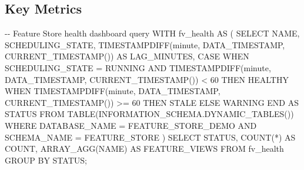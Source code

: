 \documentclass[
  letterpaper,
  DIV=11,
  numbers=noendperiod]{scrreprt}
\newenvironment{Shaded}{\begin{snugshade}}{\end{snugshade}}
\newcommand{\CommentTok}[1]{\textcolor[rgb]{0.37,0.37,0.37}{#1}}
\newcommand{\ControlFlowTok}[1]{\textcolor[rgb]{0.00,0.23,0.31}{#1}}
\newcommand{\DecValTok}[1]{\textcolor[rgb]{0.68,0.00,0.00}{#1}}
\newcommand{\FunctionTok}[1]{\textcolor[rgb]{0.28,0.35,0.67}{#1}}
\newcommand{\KeywordTok}[1]{\textcolor[rgb]{0.00,0.23,0.31}{#1}}
\newcommand{\NormalTok}[1]{\textcolor[rgb]{0.00,0.23,0.31}{#1}}
\newcommand{\OperatorTok}[1]{\textcolor[rgb]{0.37,0.37,0.37}{#1}}
\newcommand{\StringTok}[1]{\textcolor[rgb]{0.13,0.47,0.30}{#1}}
\begin{document}
\hypertarget{key-metrics}{%
\subsection{Key Metrics}\label{key-metrics}}

\begin{Shaded}
\begin{Highlighting}[]
\CommentTok{{-}{-} Feature Store health dashboard query}
\KeywordTok{WITH}\NormalTok{ fv\_health }\KeywordTok{AS}\NormalTok{ (}
    \KeywordTok{SELECT}
\NormalTok{        NAME,}
\NormalTok{        SCHEDULING\_STATE,}
\NormalTok{        TIMESTAMPDIFF(}\StringTok{\textquotesingle{}minute\textquotesingle{}}\NormalTok{, DATA\_TIMESTAMP, }\FunctionTok{CURRENT\_TIMESTAMP}\NormalTok{()) }\KeywordTok{AS}\NormalTok{ LAG\_MINUTES,}
        \ControlFlowTok{CASE}
            \ControlFlowTok{WHEN}\NormalTok{ SCHEDULING\_STATE }\OperatorTok{=} \StringTok{\textquotesingle{}RUNNING\textquotesingle{}}
                 \KeywordTok{AND}\NormalTok{ TIMESTAMPDIFF(}\StringTok{\textquotesingle{}minute\textquotesingle{}}\NormalTok{, DATA\_TIMESTAMP, }\FunctionTok{CURRENT\_TIMESTAMP}\NormalTok{()) }\OperatorTok{\textless{}} \DecValTok{60} \ControlFlowTok{THEN} \StringTok{\textquotesingle{}HEALTHY\textquotesingle{}}
            \ControlFlowTok{WHEN}\NormalTok{ TIMESTAMPDIFF(}\StringTok{\textquotesingle{}minute\textquotesingle{}}\NormalTok{, DATA\_TIMESTAMP, }\FunctionTok{CURRENT\_TIMESTAMP}\NormalTok{()) }\OperatorTok{\textgreater{}=} \DecValTok{60} \ControlFlowTok{THEN} \StringTok{\textquotesingle{}STALE\textquotesingle{}}
            \ControlFlowTok{ELSE} \StringTok{\textquotesingle{}WARNING\textquotesingle{}}
        \ControlFlowTok{END} \KeywordTok{AS}\NormalTok{ STATUS}
    \KeywordTok{FROM} \KeywordTok{TABLE}\NormalTok{(INFORMATION\_SCHEMA.DYNAMIC\_TABLES())}
    \KeywordTok{WHERE}\NormalTok{ DATABASE\_NAME }\OperatorTok{=} \StringTok{\textquotesingle{}FEATURE\_STORE\_DEMO\textquotesingle{}}
      \KeywordTok{AND}\NormalTok{ SCHEMA\_NAME }\OperatorTok{=} \StringTok{\textquotesingle{}FEATURE\_STORE\textquotesingle{}}
\NormalTok{)}
\KeywordTok{SELECT}
\NormalTok{    STATUS,}
    \FunctionTok{COUNT}\NormalTok{(}\OperatorTok{*}\NormalTok{) }\KeywordTok{AS} \FunctionTok{COUNT}\NormalTok{,}
\NormalTok{    ARRAY\_AGG(NAME) }\KeywordTok{AS}\NormalTok{ FEATURE\_VIEWS}
\KeywordTok{FROM}\NormalTok{ fv\_health}
\KeywordTok{GROUP} \KeywordTok{BY}\NormalTok{ STATUS;}
\end{Highlighting}
\end{Shaded}
\end{document}
